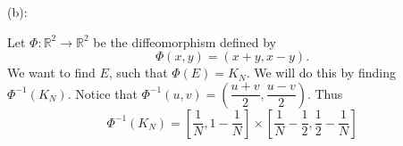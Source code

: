\documentclass{../../../tex-setup/eh-homework}
\begin{document}
\begin{question}{38}
    (b):

    Let \(\Phi : \mathbb{R}^2 \to \mathbb{R}^2\) be the diffeomorphism defined by
    \[
        \Phi (x,y) = (x+y, x-y).
    \]
    We want to find \(E\), such that \(\Phi (E) = K_N\). We will do this by finding \(\Phi ^{-1}(K_N)\). Notice that \(\Phi ^{-1}(u,v) = \left( \dfrac{u+v}{2}, \dfrac{u-v}{2} \right)\). Thus
    \[
        \Phi ^{-1} (K_N) = \left[ \frac{1}{N}, 1-\frac{1}{N} \right] \times \left[ \frac{1}{N} - \frac{1}{2}, \frac{1}{2} - \frac{1}{N} \right] 
    \]
    \end{question}
\end{document}
